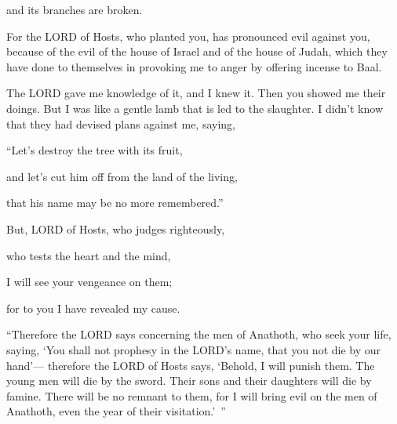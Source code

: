 and its branches are broken.


\myverse{}For the LORD of Hosts, who planted you, has pronounced evil against you, because of the evil of the house of Israel and of the house of Judah, which they have done to themselves in provoking me to anger by offering incense to Baal.


\myverse{}The LORD gave me knowledge of it, and I knew it. Then you showed
me their doings. \myverse{}But I was like a gentle lamb that is led to the slaughter. I didn’t know that they had devised plans against me, saying,

“Let’s destroy the tree with its fruit,

and let’s cut him off from the land of the living,

that his name may be no more remembered.”


\myverse{}But, LORD of Hosts, who judges righteously,

who tests the heart and the mind,

I will see your vengeance on them;

for to you I have revealed my cause.


\myverse{}“Therefore the LORD says concerning the men of Anathoth, who
seek your life, saying, ‘You shall not prophesy in the LORD’s name, that you not die by our hand’— \myverse{}therefore the LORD of Hosts says, ‘Behold, I will punish them. The young men will die by the sword. Their sons and their daughters will die by famine. \myverse{}There will be no remnant to them, for I will bring evil on the men of Anathoth, even the year of their visitation.’ ”

